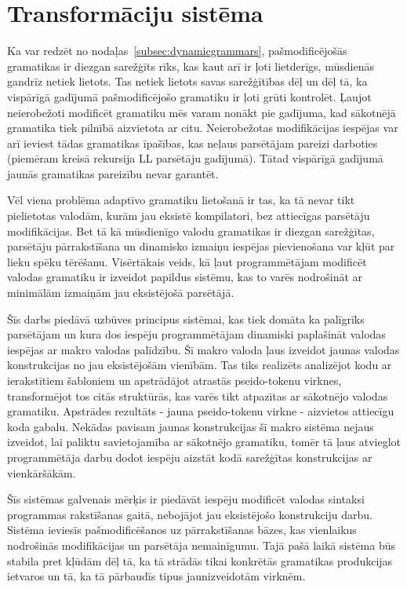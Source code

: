 \section{Transformāciju sistēma}
Ka var redzēt no nodaļas~\ref{subsec:dynamicgrammars}, pašmodificējošās gramatikas ir diezgan sarežģīts rīks, kas kaut arī ir ļoti lietderīgs, mūsdienās gandrīz netiek lietots. Tas netiek lietots savas sarežģītības dēļ un dēļ tā, ka vispārīgā gadījumā pašmodificējošo gramatiku ir ļoti grūti kontrolēt. Ļaujot neierobežoti modificēt gramatiku mēs varam nonākt pie gadījuma, kad sākotnējā gramatika tiek pilnībā aizvietota ar citu. Neierobežotas modifikācijas iespējas var arī ieviest tādas gramatikas īpašības, kas neļaus parsētājam pareizi darboties (piemēram kreisā rekursija LL parsētāju gadījumā). Tātad vispārīgā gadījumā jaunās gramatikas pareizību nevar garantēt.

Vēl viena problēma adaptīvo gramatiku lietošanā ir tas, ka tā nevar tikt pielietotas valodām, kurām jau eksistē kompilatori, bez attiecīgas parsētāju modifikācijas. Bet tā kā mūsdienīgo valodu gramatikas ir diezgan sarežģītas, parsētāju pārrakstīšana un dinamisko izmaiņu iespējas pievienošana var kļūt par lieku spēku tērēšanu. Visērtākais veids, kā ļaut programmētājam modificēt valodas gramatiku ir izveidot papildus sistēmu, kas to varēs nodrošināt ar minimālām izmaiņām jau eksistējošā parsētājā.

Šīs darbs piedāvā uzbūves principus sistēmai, kas tiek domāta ka palīgrīks parsētājam un kura dos iespēju programmētājam dinamiski paplašināt valodas iespējas ar makro valodas palīdzību. Šī makro valoda ļaus izveidot jaunas valodas konstrukcijas no jau eksistējošām vienībām. Tas tiks realizēts analizējot kodu ar ierakstītiem šabloniem un apstrādājot atrastās pseido-tokenu virknes, transformējot tos citās struktūrās, kas varēs tikt atpazītas ar sākotnējo valodas gramatiku. Apstrādes rezultāts - jauna pseido-tokenu virkne - aizvietos attiecīgu koda gabalu. Nekādas pavisam jaunas konstrukcijas šī makro sistēma nejaus izveidot, lai paliktu savietojamība ar sākotnējo gramatiku, tomēr tā ļaus atvieglot programmētāja darbu dodot iespēju aizstāt kodā sarežģītas konstrukcijas ar vienkāršākām. 

Šīs sistēmas galvenais mērķis ir piedāvāt iespēju modificēt valodas sintaksi programmas rakstīšanas gaitā, nebojājot jau eksistējošo konstrukciju darbu. Sistēma ieviesīs pašmodificēšanos uz pārrakstīšanas bāzes, kas vienlaikus nodrošinās modifikācijas un parsētāja nemainīgumu. Tajā pašā laikā sistēma būs stabila pret kļūdām dēļ tā, ka tā strādās tikai konkrētās gramatikas produkcijas ietvaros un tā, ka tā pārbaudīs tipus jaunizveidotām virknēm.

